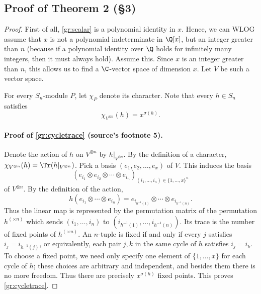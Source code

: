 \subsection*{Proof of Theorem 2 (\S3)}
\begin{proof}
First of all, \eqref{gr:scalar} is a polynomial identity in $x$. Hence, we can WLOG assume that $x$ is not a polynomial indeterminate in $\Q[x]$, but an integer greater than $n$ (because if a polynomial identity over $\Q$ holds for infinitely many integers, then it must always hold). Assume this. Since $x$ is an integer greater than $n$, this allows us to find a $\C$-vector space of dimension $x$. Let $V$ be such a vector space.

For every $S_n$-module $P$, let $\chi_P$ denote its character. Note that every $h\in S_n$ satisfies
\begin{equation}\label{gr:cycletrace}
\chi_{V^{\otimes n}}(h)=x^{\sigma(h)}.
\end{equation}
\paragraph{Proof of \eqref{gr:cycletrace} (source's footnote 5).}
Denote the action of $h$ on $V^{\otimes n}$ by $h|_{V^{\otimes n}}$. By the definition of a character, $\chi_{V^{\otimes n}}(h)=\Tr(h|_{V^{\otimes n}})$.
Pick a basis $(e_1,e_2,\ldots,e_x)$ of $V$. This induces the basis
\[
(e_{i_1}\otimes e_{i_2}\otimes\cdots\otimes e_{i_n})_{(i_1,\ldots,i_n)\in\{1,\ldots,x\}^n}
\]
of $V^{\otimes n}$. By the definition of the action,
\[
h(e_{i_1}\otimes\cdots\otimes e_{i_n})
=e_{i_{h^{-1}(1)}}\otimes\cdots\otimes e_{i_{h^{-1}(n)}}.
\]
Thus the linear map is represented by the permutation matrix of the permutation $h^{(\times n)}$ which sends $(i_1,\ldots,i_n)$ to $(i_{h^{-1}(1)},\ldots,i_{h^{-1}(n)})$. Its trace is the number of fixed points of $h^{(\times n)}$.
An $n$-tuple is fixed if and only if every $j$ satisfies $i_j=i_{h^{-1}(j)}$, or equivalently, each pair $j,k$ in the same cycle of $h$ satisfies $i_j=i_k$. To choose a fixed point, we need only specify one element of $\{1,\ldots,x\}$ for each cycle of $h$; these choices are arbitrary and independent, and besides them there is no more freedom. Thus there are precisely $x^{\sigma(h)}$ fixed points. This proves \eqref{gr:cycletrace}.


\end{proof}
